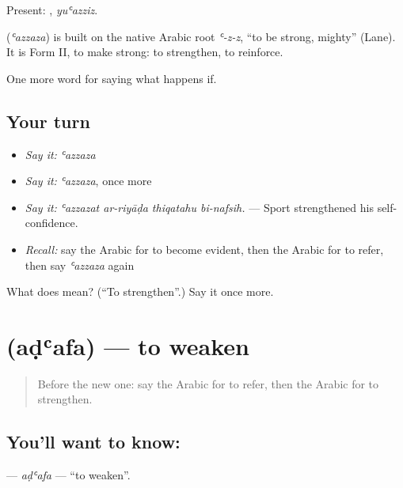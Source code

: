 Present: , \emph{yuʿazziz}.

\begin{cousinweb}
\textbf{} (\emph{ʿazzaza}) is built on the native Arabic root \emph{ʿ-z-z}, \textquotedblleft{}to be strong, mighty\textquotedblright{} (Lane). It is Form II, to make strong: to strengthen, to reinforce.
\end{cousinweb}

\begin{grammarlens}[title={What you've built}]
One more word for saying what happens if.
\end{grammarlens}

\subsection*{Your turn}
\begin{itemize}
\raggedright
  \item \emph{Say it:} \emph{ʿazzaza}
  \item \emph{Say it:} \emph{ʿazzaza}, once more
  \item \emph{Say it:} \emph{ʿazzazat ar-riyāḍa thiqatahu bi-nafsih.} — Sport strengthened his self-confidence.
  \item \emph{Recall:} say the Arabic for to become evident, then the Arabic for to refer, then say \emph{ʿazzaza} again
\end{itemize}

\begin{tcolorbox}[breakable,colback=teal!4,colframe=teal!35!black,title={Before you move on}]
What does  mean? (\textquotedblleft{}To strengthen\textquotedblright{}.) Say it once more.
\end{tcolorbox}
\section[\texorpdfstring{\ar{أضعف} (aḍʿafa)}{أضعف (aḍʿafa)}]{ (aḍʿafa) — to weaken}

\label{lesson:AR-C418-adafa-weaken}



\begin{quote}
Before the new one: say the Arabic for to refer, then the Arabic for to strengthen.
\end{quote}

\subsection*{You'll want to know: }
\textbf{} — \emph{aḍʿafa} — \textquotedblleft{}to weaken\textquotedblright{}.

